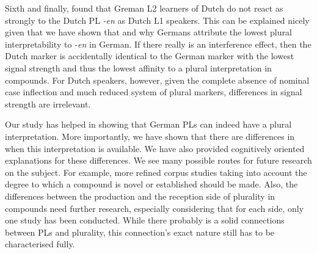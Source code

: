 Sixth and finally, \textcite{BangaEa2013b} found that Greman L2 learners of Dutch do not react as strongly to the Dutch PL \textit{-en} as Dutch L1 speakers.
This can be explained nicely given that we have shown that and why Germans attribute the lowest plural interpretability to \textit{-en} in German.
If there really is an interference effect, then the Dutch marker is accidentally identical to the German marker with the lowest signal strength and thus the lowest affinity to a plural interpretation in compounds.
For Dutch speakers, however, given the complete absence of nominal case inflection and much reduced system of plural markers, differences in signal strength are irrelevant.

Our study has helped in showing that German PLs can indeed have a plural interpretation.
More importantly, we have shown that there are differences in when this interpretation is available.
We have also provided cognitively oriented explanations for these differences.
We see many possible routes for future research on the subject.
For example, more refined corpus studies taking into account the degree to which a compound is novel or established should be made.
Also, the differences between the production and the reception side of plurality in compounds need further research, especially considering that for each side, only one study has been conducted.
While there probably is a solid connections between PLs and plurality, this connection's exact nature still has to be characterised fully.
